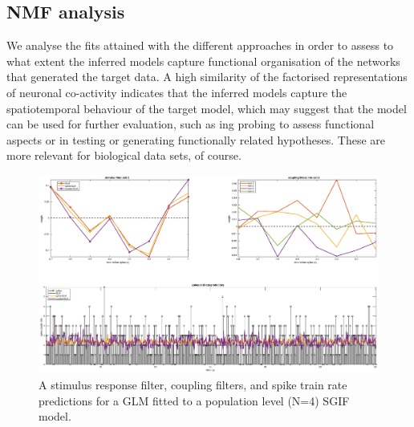 \documentclass[mphil,deptreport,ianc]{infthesis} %
\begin{document}
\subsection{NMF analysis}

We analyse the fits attained with the different approaches in order to assess to what extent the inferred models capture functional organisation of the networks that generated the target data.
A high similarity of the factorised representations of neuronal co-activity indicates that the inferred models capture the spatiotemporal behaviour of the target model, which may suggest that the model can be used for further evaluation, such as ing probing to assess functional aspects or in testing or generating functionally related hypotheses. These are more relevant for biological data sets, of course.




\begin{figure}
    \hspace{-0.1\columnwidth}
    \includegraphics[width=1.2\columnwidth]{figures/matlab/export_GLM_filters_pred_bin_size_0_1_cell_2_target_GT_model_mesoGIF_N_4.eps}
    \caption{A stimulus response filter, coupling filters, and spike train rate predictions for a GLM fitted to a population level (N=4) SGIF model.}
    \label{fig:GLM_mesoGIF}
\end{figure}
\end{document}
